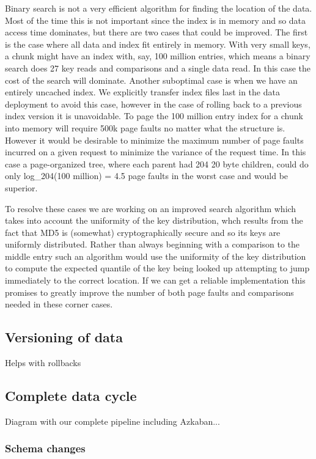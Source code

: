\documentclass[10pt,twocolumn,preprint,natbib,authoryear]{sigplanconf}
\begin{document}
Binary search is not a very efficient algorithm for finding the location of the data. Most of the time this is not important since the index is in memory and so data access time dominates, but there are two cases that could be improved. The first is the case where all data and index fit entirely in memory. With very small keys, a chunk might have an index with, say, 100 million entries, which means a binary search does 27 key reads and comparisons and a single data read. In this case the cost of the search will dominate. Another suboptimal case is when we have an entirely uncached index. We explicitly transfer index files last in the data deployment to avoid this case, however in the case of rolling back to a previous index version it is unavoidable. To page the 100 million entry index for a chunk into memory will require 500k page faults no matter what the structure is. However it would be desirable to minimize the maximum number of page faults incurred on a given request to minimize the variance of the request time. In this case a page-organized tree, where each parent had 204 20 byte children, could do only log\_204(100 million) = 4.5 page faults in the worst case and would be superior.

To resolve these cases we are working on an improved search algorithm which takes into account the uniformity of the key distribution, whch results from the fact that MD5 is (somewhat) cryptographically secure and so its keys are uniformly distributed. Rather than always beginning with a comparison to the middle entry such an algorithm would use the uniformity of the key distribution to compute the expected quantile of the key being looked up attempting to jump immediately to the correct location. If we can get a reliable implementation this promises to greatly improve the number of both page faults and comparisons needed in these corner cases.



\subsection{Versioning of data}
Helps with rollbacks


\subsection{Complete data cycle}

Diagram with our complete pipeline including Azkaban...

\subsubsection{Schema changes}
\end{document}

